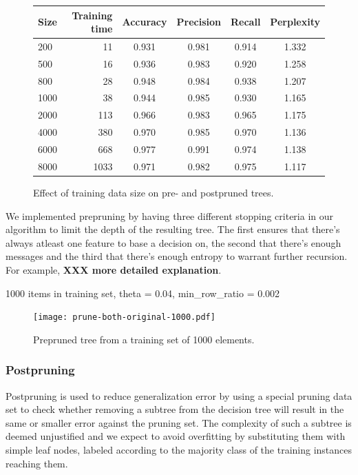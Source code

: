 \documentclass[a4paper,10pt]{article}
\newcommand{\XXX}[1]{{\bf XXX #1}}
\begin{document}
\begin{figure}
  \centering
\begin{tabular}{|l|r|c|c|c|c|}
\hline
Size & Training time & Accuracy & Precision & Recall &
Perplexity \\ \hline 
200  & 11 & 0.931 & 0.981 & 0.914 & 1.332 \\
500  & 16 & 0.936 & 0.983 & 0.920 & 1.258 \\
800  & 28 & 0.948 & 0.984 & 0.938 & 1.207 \\
1000 & 38 & 0.944 & 0.985 & 0.930 & 1.165 \\
2000 & 113 & 0.966 & 0.983 & 0.965 & 1.175 \\
4000 & 380 & 0.970 & 0.985 & 0.970 & 1.136 \\
6000 & 668 & 0.977 & 0.991 & 0.974 & 1.138 \\
8000 & 1033 & 0.971 & 0.982 & 0.975 & 1.117 \\
\hline
\end{tabular}
  \caption{Effect of training data size on pre- and postpruned trees.}
  \label{tbl:classifiers-prune-both} 
\end{figure}

We implemented prepruning by having three different stopping criteria in
our algorithm to limit the depth of the resulting tree.  The first ensures
that there's always atleast one feature to base a decision on, the second
that there's enough messages and the third that there's enough entropy to
warrant further recursion.  For example, \XXX{more detailed explanation}.

1000 items in training set, theta = 0.04, min\_row\_ratio = 0.002

\begin{figure}[h]
  \centering
  \begin{minipage}[c]{1.0\textwidth}
    \centering
\texttt{[image: prune-both-original-1000.pdf]}
  \end{minipage}
  \caption{Prepruned tree from a training set of 1000 elements.}
  \label{fig:prepruned-1000}
\end{figure}

\subsubsection{Postpruning}
\label{sect:postpruning}

Postpruning is used to reduce generalization error by using a special
pruning data set to check whether removing a subtree from the decision
tree will result in the same or smaller error against the pruning set.
The complexity of such a subtree is deemed unjustified and we expect
to avoid overfitting by substituting them with simple leaf nodes,
labeled according to the majority class of the training instances
reaching them\cite[p. 183]{alpaydin2004}.
\end{document}
